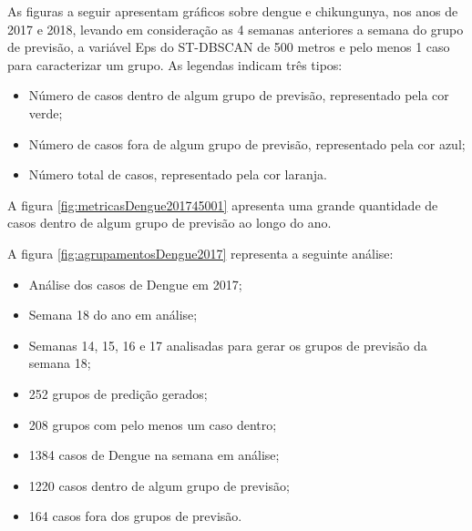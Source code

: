 As figuras a seguir apresentam gráficos sobre dengue e chikungunya, nos anos de 2017 e 2018, levando em consideração as 4 semanas anteriores a semana do grupo de previsão, a variável Eps do ST-DBSCAN de 500 metros e pelo menos 1 caso para caracterizar um grupo.
As legendas indicam três tipos:
\begin{itemize}
    \item Número de casos dentro de algum grupo de previsão, representado pela cor verde;
    \item Número de casos fora de algum grupo de previsão, representado pela cor azul;
    \item Número total de casos, representado pela cor laranja.
\end{itemize}

A figura \ref{fig:metricasDengue201745001} apresenta uma grande quantidade de casos dentro de algum grupo de previsão ao longo do ano.
\begin{figure}[!ht]
	\centering	
\end{figure}
\FloatBarrier

A figura \ref{fig:agrupamentosDengue2017} representa a seguinte análise:
\begin{itemize}
    \item Análise dos casos de Dengue em 2017;
    \item Semana 18 do ano em análise;
    \item Semanas  14, 15, 16 e 17 analisadas para gerar os grupos de previsão da semana 18;
    \item 252 grupos de predição gerados;
    \item 208 grupos com pelo menos um caso dentro;
    \item 1384 casos de Dengue na semana em análise;
    \item 1220 casos dentro de algum grupo de previsão;
    \item 164 casos fora dos grupos de previsão.
\end{itemize}

